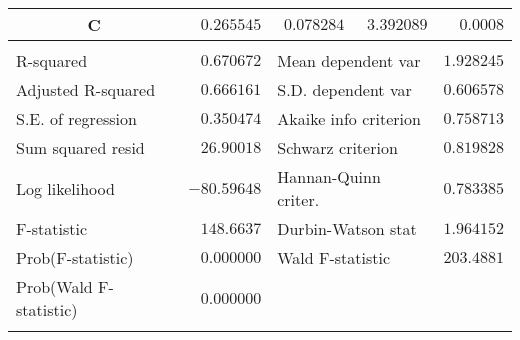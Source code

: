 \begin{tabular}{lrrrr}
\multicolumn{1}{c}{C}&\multicolumn{1}{r}{$0.265545$}&\multicolumn{1}{r}{$0.078284$}&\multicolumn{1}{r}{$3.392089$}&\multicolumn{1}{r}{$0.0008$}\\
[4.5pt] \hline \\ [-4.5pt]
\multicolumn{1}{l}{R-squared}&\multicolumn{1}{r}{$0.670672$}&\multicolumn{2}{l}{Mean dependent var}&\multicolumn{1}{r}{$1.928245$}\\
\multicolumn{1}{l}{Adjusted R-squared}&\multicolumn{1}{r}{$0.666161$}&\multicolumn{2}{l}{S.D. dependent var}&\multicolumn{1}{r}{$0.606578$}\\
\multicolumn{1}{l}{S.E. of regression}&\multicolumn{1}{r}{$0.350474$}&\multicolumn{2}{l}{Akaike info criterion}&\multicolumn{1}{r}{$0.758713$}\\
\multicolumn{1}{l}{Sum squared resid}&\multicolumn{1}{r}{$26.90018$}&\multicolumn{2}{l}{Schwarz criterion}&\multicolumn{1}{r}{$0.819828$}\\
\multicolumn{1}{l}{Log likelihood}&\multicolumn{1}{r}{$-80.59648$}&\multicolumn{2}{l}{Hannan-Quinn criter.}&\multicolumn{1}{r}{$0.783385$}\\
\multicolumn{1}{l}{F-statistic}&\multicolumn{1}{r}{$148.6637$}&\multicolumn{2}{l}{Durbin-Watson stat}&\multicolumn{1}{r}{$1.964152$}\\
\multicolumn{1}{l}{Prob(F-statistic)}&\multicolumn{1}{r}{$0.000000$}&\multicolumn{2}{l}{Wald F-statistic}&\multicolumn{1}{r}{$203.4881$}\\
\multicolumn{1}{l}{Prob(Wald F-statistic)}&\multicolumn{1}{r}{$0.000000$}&\multicolumn{1}{c}{}&\multicolumn{1}{c}{}&\multicolumn{1}{c}{}\\
[4.5pt] \hline \\ [-4.5pt]
\end{tabular}

